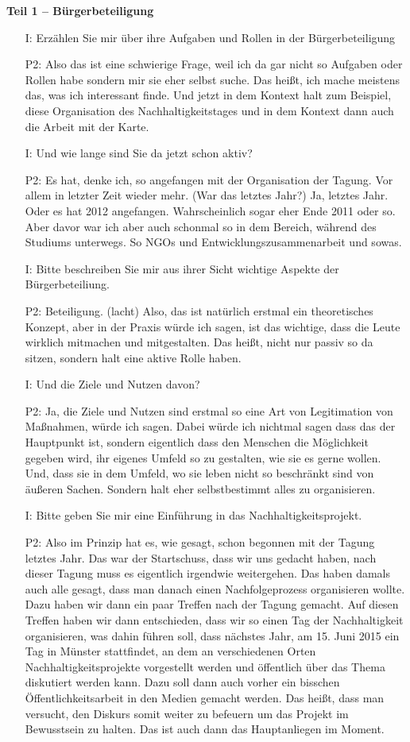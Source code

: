 \textbf{Teil 1 -- B{\"u}rgerbeteiligung}
\begin{itemize}
    \item[I:] Erz{\"a}hlen Sie mir {\"u}ber ihre Aufgaben und Rollen in der B{\"u}rgerbeteiligung
    \item[P2:] Also das ist eine schwierige Frage, weil ich da gar nicht so Aufgaben oder Rollen habe sondern mir sie eher selbst suche. Das hei{\ss}t, ich mache meistens das, was ich interessant finde. Und jetzt in dem Kontext halt zum Beispiel, diese Organisation des Nachhaltigkeitstages und in dem Kontext dann auch die Arbeit mit der Karte.
    \item[I:] Und wie lange sind Sie da jetzt schon aktiv? 
    \item[P2:] Es hat, denke ich, so angefangen mit der Organisation der Tagung. Vor allem in letzter Zeit wieder mehr. (War das letztes Jahr?) Ja, letztes Jahr. Oder es hat 2012 angefangen. Wahrscheinlich sogar eher Ende 2011 oder so. Aber davor war ich aber auch schonmal so in dem Bereich, w{\"a}hrend des Studiums unterwegs. So NGOs und Entwicklungszusammenarbeit und sowas.
    \item[I:] Bitte beschreiben Sie mir aus ihrer Sicht wichtige Aspekte der B{\"u}rgerbeteiliung.
    \item[P2:] Beteiligung. (lacht) Also, das ist nat{\"u}rlich erstmal ein theoretisches Konzept, aber in der Praxis w{\"u}rde ich sagen, ist das wichtige, dass die Leute wirklich mitmachen und mitgestalten. Das hei{\ss}t, nicht nur passiv so da sitzen, sondern halt eine aktive Rolle haben.
    \item[I:] Und die Ziele und Nutzen davon?
    \item[P2:] Ja, die Ziele und Nutzen sind erstmal so eine Art von Legitimation von Ma{\ss}nahmen, w{\"u}rde ich sagen. Dabei w{\"u}rde ich nichtmal sagen dass das der Hauptpunkt ist, sondern eigentlich dass den Menschen die M{\"o}glichkeit gegeben wird, ihr eigenes Umfeld so zu gestalten, wie sie es gerne wollen. Und, dass sie in dem Umfeld, wo sie leben nicht so beschr{\"a}nkt sind von {\"a}u{\ss}eren Sachen. Sondern halt eher selbstbestimmt alles zu organisieren.
    \item[I:] Bitte geben Sie mir eine Einf{\"u}hrung in das Nachhaltigkeitsprojekt.
    \item[P2:] Also im Prinzip hat es, wie gesagt, schon begonnen mit der Tagung letztes Jahr. Das war der Startschuss, dass wir uns gedacht haben, nach dieser Tagung muss es eigentlich irgendwie weitergehen. Das haben damals auch alle gesagt, dass man danach einen Nachfolgeprozess organisieren wollte. Dazu haben wir dann ein paar Treffen nach der Tagung gemacht. Auf diesen Treffen haben wir dann entschieden, dass wir so einen Tag der Nachhaltigkeit organisieren, was dahin f{\"u}hren soll, dass n{\"a}chstes Jahr, am 15. Juni 2015 ein Tag in M{\"u}nster stattfindet, an dem an verschiedenen Orten Nachhaltigkeitsprojekte vorgestellt werden und {\"o}ffentlich {\"u}ber das Thema diskutiert werden kann. Dazu soll dann auch vorher ein bisschen {\"O}ffentlichkeitsarbeit in den Medien gemacht werden. Das hei{\ss}t, dass man versucht, den Diskurs somit weiter zu befeuern um das Projekt im Bewusstsein zu halten. Das ist auch dann das Hauptanliegen im Moment.

\end{itemize}

